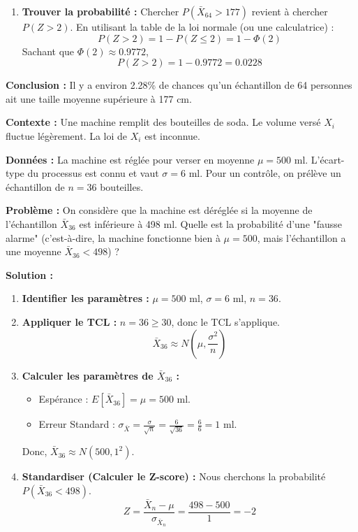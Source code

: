 \begin{examplebox}
\begin{enumerate}
    \item \textbf{Trouver la probabilité :}
    Chercher $P(\bar{X}_{64} > 177)$ revient à chercher $P(Z > 2)$.
    En utilisant la table de la loi normale (ou une calculatrice) :
    $$ P(Z > 2) = 1 - P(Z \le 2) = 1 - \Phi(2) $$
    Sachant que $\Phi(2) \approx 0.9772$,
    $$ P(Z > 2) = 1 - 0.9772 = 0.0228 $$
\end{enumerate}
\textbf{Conclusion :} Il y a environ 2.28\% de chances qu'un échantillon de 64 personnes ait une taille moyenne supérieure à 177 cm.
\end{examplebox}

\begin{examplebox}
\textbf{Contexte :} Une machine remplit des bouteilles de soda. Le volume versé $X_i$ fluctue légèrement. La loi de $X_i$ est inconnue.

\textbf{Données :} La machine est réglée pour verser en moyenne $\mu = 500$ ml. L'écart-type du processus est connu et vaut $\sigma = 6$ ml. Pour un contrôle, on prélève un échantillon de $n=36$ bouteilles.

\textbf{Problème :} On considère que la machine est déréglée si la moyenne de l'échantillon $\bar{X}_{36}$ est inférieure à 498 ml. Quelle est la probabilité d'une "fausse alarme" (c'est-à-dire, la machine fonctionne bien à $\mu=500$, mais l'échantillon a une moyenne $\bar{X}_{36} < 498$) ?

\textbf{Solution :}
\begin{enumerate}
    \item \textbf{Identifier les paramètres :}
    $\mu = 500$ ml, $\sigma = 6$ ml, $n = 36$.
    
    \item \textbf{Appliquer le TCL :}
    $n=36 \ge 30$, donc le TCL s'applique.
    $$ \bar{X}_{36} \approx N\left(\mu, \frac{\sigma^2}{n}\right) $$
    
    \item \textbf{Calculer les paramètres de $\bar{X}_{36}$ :}
    \begin{itemize}
        \item Espérance : $E[\bar{X}_{36}] = \mu = 500$ ml.
        \item Erreur Standard : $\sigma_{\bar{X}} = \frac{\sigma}{\sqrt{n}} = \frac{6}{\sqrt{36}} = \frac{6}{6} = 1$ ml.
    \end{itemize}
    Donc, $\bar{X}_{36} \approx N(500, 1^2)$.
    
    \item \textbf{Standardiser (Calculer le Z-score) :}
    Nous cherchons la probabilité $P(\bar{X}_{36} < 498)$.
    $$ Z = \frac{\bar{X}_n - \mu}{\sigma_{\bar{X}_n}} = \frac{498 - 500}{1} = -2 $$
    

\end{enumerate}
\end{examplebox}
